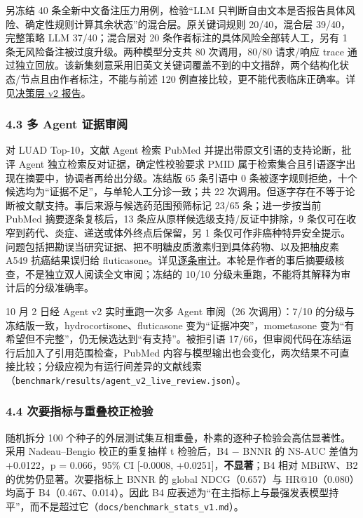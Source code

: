 \documentclass[
  10pt,
]{ctexart}
\begin{document}
另冻结 40 条全新中文备注压力用例，检验``LLM
只判断自由文本是否报告具体风险、确定性规则计算其余状态''的混合层。原关键词规则
20/40，混合层 39/40，完整策略 LLM 37/40；混合层对 20
条作者标注的具体风险全部转人工，另有 1
条无风险备注被过度升级。两种模型分支共 80 次调用，80/80 请求/响应 trace
通过独立回放。该新集刻意采用旧英文关键词覆盖不到的中文措辞，两个结构化状态/节点且由作者标注，不能与前述
120
例直接比较，更不能代表临床正确率。详见\href{docs/decision_eval_v2.md}{决策层
v2 报告}。

\subsubsection{4.3 多 Agent
证据审阅}\label{43-ux591a-agent-ux8bc1ux636eux5ba1ux9605}

对 LUAD Top-10，文献 Agent 检索 PubMed 并提出带原文引语的支持论断，批评
Agent 独立检索反对证据，确定性校验要求 PMID
属于检索集合且引语逐字出现在摘要中，协调者再给出分级。冻结版 65 条引语中
0 条被逐字规则拒绝，十个候选均为``证据不足''，与单轮人工分诊一致；共 22
次调用。但逐字存在不等于论断被文献支持。事后来源与候选药范围预筛标记
23/65 条；进一步按当前 PubMed 摘要逐条复核后，13
条应从原样候选级支持/反证中排除，9
条仅可在收窄到药代、炎症、递送或体外终点后保留，另 1
条仅可作非癌种特异安全提示。问题包括把勘误当研究证据、把不明糖皮质激素归到具体药物、以及把柚皮素
A549 抗癌结果误归给
fluticasone。详见\href{docs/evidence_scope_audit.md}{逐条审计}。本轮是作者的事后摘要级核查，不是独立双人阅读全文审阅；冻结的
10/10 分级未重跑，不能将其解释为审计后的分级准确率。

10 月 2 日经 Agent v2 实时重跑一次多 Agent 审阅（26 次调用）：7/10
的分级与冻结版一致，hydrocortisone、fluticasone
变为``证据冲突''，mometasone
变为``有希望但不完整''，仍无候选达到``有支持''。被拒引语
17/66，但审阅代码在冻结运行后加入了引用范围检查，PubMed
内容与模型输出也会变化，两次结果不可直接比较；分级应视为有运行间差异的文献线索（\texttt{benchmark/\allowbreak{}results/\allowbreak{}agent\_\allowbreak{}v2\_\allowbreak{}live\_\allowbreak{}review.\allowbreak{}json}）。

\subsubsection{4.4
次要指标与重叠校正检验}\label{44-ux6b21ux8981ux6307ux6807ux4e0eux91cdux53e0ux6821ux6b63ux68c0ux9a8c}

随机拆分 100
个种子的外层测试集互相重叠，朴素的逐种子检验会高估显著性。采用
Nadeau--Bengio 校正的重复抽样 t 检验后，B4 − BNNR 的 NS-AUC 差值为
+0.0122，p = 0.066，95\% CI {[}-0.0008, +0.0251{]}，\textbf{不显著}；B4
相对 MBiRW、B2 的优势仍显著。次要指标上 BNNR 的 global NDCG（0.657）与
HR@10（0.080）均高于 B4（0.467、0.014）。因此 B4
应表述为``在主指标上与最强发表模型持平''，而不是超过它（\texttt{docs/\allowbreak{}benchmark\_\allowbreak{}stats\_\allowbreak{}v1.\allowbreak{}md}）。
\end{document}
